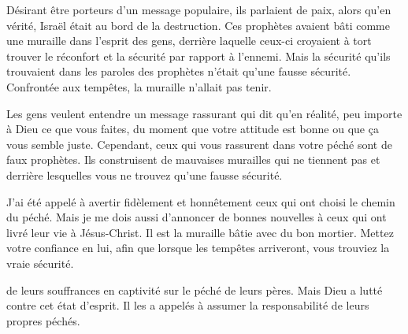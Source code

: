 Désirant être porteurs d'un message populaire, ils parlaient de paix,
 alors qu'en vérité, Israël était au bord de la destruction.
 Ces prophètes avaient bâti comme une \og muraille \fg{}
 dans l'esprit des gens, derrière laquelle 
 ceux-ci croyaient à tort trouver le réconfort et la sécurité par rapport
 à l'ennemi. Mais la sécurité qu'ils trouvaient dans les paroles
 des prophètes n'était qu'une fausse sécurité.
 Confrontée aux tempêtes, la \og muraille \fg{} n'allait pas tenir. 


Les gens veulent entendre un message rassurant qui dit
  qu'en réalité,
 peu importe à Dieu ce que vous faites, du moment que votre attitude est bonne
 ou que ça vous semble juste.
 Cependant, ceux qui vous rassurent dans votre péché sont de faux prophètes.
 Ils construisent de mauvaises murailles qui ne tiennent pas et
 derrière lesquelles 
 vous ne trouvez qu'une fausse sécurité. 

J'ai été appelé à avertir fidèlement et honnêtement ceux qui ont choisi
 le chemin du péché. Mais je me dois aussi d'annoncer de bonnes nouvelles
 à ceux qui ont livré leur vie à Jésus-Christ.
 Il est la muraille bâtie avec du bon mortier. Mettez votre confiance en lui,
 afin que lorsque les tempêtes arriveront, vous trouviez la vraie sécurité. 

\dvrule






 de leurs souffrances en captivité sur le péché de leurs pères.
 Mais Dieu a lutté contre cet état d'esprit.
 Il les a appelés à assumer la responsabilité de leurs propres péchés. 

